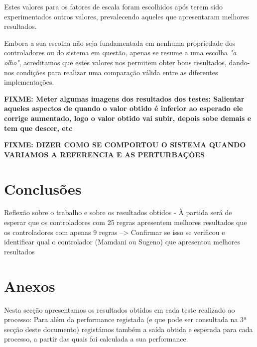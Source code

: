 \documentclass{article}
\begin{document}
Estes valores para os fatores de escala foram escolhidos após terem sido experimentados outros valores, prevalecendo aqueles que apresentaram melhores resultados.

Embora a sua escolha não seja fundamentada em nenhuma propriedade dos controladores ou do sistema em questão, apenas se resume a uma escolha \emph{"a olho"}, acreditamos que estes valores nos permitem obter bons resultados, dando-nos condições para realizar uma comparação válida entre as diferentes implementações.

\vspace{1cm}

\textbf{FIXME: Meter algumas imagens dos resultados dos testes: Salientar aqueles aspectos de quando o valor obtido é inferior ao esperado ele corrige aumentado, logo o valor obtido vai subir, depois sobe demais e tem que descer, etc}

\textbf{FIXME: DIZER COMO SE COMPORTOU O SISTEMA QUANDO VARIAMOS A REFERENCIA E AS PERTURBAÇÕES}

\pagebreak

\section{Conclusões}

Reflexão sobre o trabalho e sobre os resultados obtidos - À partida será de esperar que os controladores com 25 regras apresentem melhores resultados que os controladores com apenas 9 regras --> Confirmar se isso se verificou e identificar qual o controlador (Mamdani ou Sugeno) que apresentou melhores resultados

\pagebreak

\section{Anexos}

Nesta secção apresentamos os resultados obtidos em cada teste realizado ao processo: Para além da performance registada (e que pode ser consultada na 3ª secção deste documento) registámos também a saída obtida e esperada para cada processo, a partir das quais foi calculada a sua performance.

\vspace{.2cm}

\end{document}
